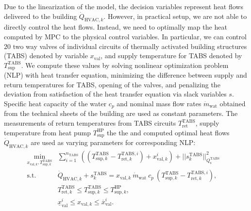 \documentclass[10pt]{extarticle}
\newcommand{\lrp}[1]{\ensuremath{\left( #1 \right)}}
\begin{document}
Due to the linearization of the model, the decision variables represent heat flows delivered to the building $\dot{Q}_{\text{HVAC},k}$. However, in practical setup, we are not able to directly control the heat flows. Instead, we need to optimally map the heat computed by MPC to the physical control variables. In particular, we can control $20$ two way valves of individual circuits of thermally activated building structures (TABS) denoted by variable $x_{\text{val}}$, and supply temperature for TABS denoted by $T^{\text{TABS}}_{\text{sup}}$. We compute these values by solving nonlinear optimization problem (NLP) with heat transfer equation, minimizing the difference between supply and return temperatures for TABS, opening  of the valves, and  penalizing the deviation from satisfaction of the heat transfer equation via slack variables $s$. Specific heat capacity of the water $c_p$ and nominal mass flow rates $\dot{m}_{\text{wat}}$ obtained from the technical sheets of the building are used as constant parameters. The measurements of return temperatures from TABS circuits $T^{\text{TABS}}_{\text{ret}}$, supply temperature from heat pump $T^{\text{HP}}_{\text{sup}}$ the the  and computed optimal heat flows $\dot{Q}_{\text{HVAC},k}$ are used as varying parameters for corresponding NLP:
\begin{subequations}
\label{eq:NLP_postprocess}
\begin{align}
 \min_{x_{\text{val},k}, T_{\text{sup},k}^{\text{TABS}}} &  \sum_{i=1}^{n_{\text{TABS}}} \lrp{(T_{\text{sup},k}^{\text{TABS}} - T_{\text{ret},k}^{\text{TABS},i}) + x_{\text{val},k}^i } +  || s_{k}^{\text{TABS}} ||_{Q^{\text{TABS}}_{\text{s}}}^2 &
 \label{eq:NLP_postprocess:cost}\\
  \text{s.t.} \ &  \dot{Q}_{\text{HVAC},k} + s_{k}^{\text{TABS}} = x_{\text{val},k} \ \dot{m}_{\text{wat}} \ c_p \ (T_{\text{sup},k}^{\text{TABS}} -  T_{\text{ret},k}^{\text{TABS},i}), &  \label{eq:NLP_postprocess:heat_equation} \\
   &  T_{\text{ret},k}^{\text{TABS}} \le T_{\text{sup},k}^{\text{TABS}} \le T_{\text{sup},k}^{\text{HP}}, \label{eq:NLP_postprocess:tsup_minmax}\\
    & \underline{x}^i_{\text{val}} \le x_{\text{val},k} \le \overline{x}^i_{\text{val}}.   \label{eq:NLP_postprocess:valve_minmax}
\end{align}
\end{subequations}
\end{document}
